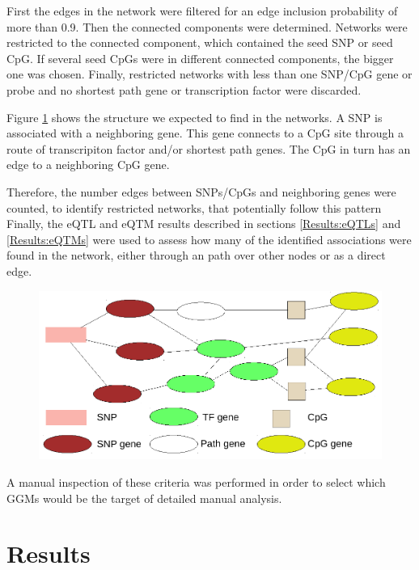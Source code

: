 \documentclass[a4paper,12pt,twoside,openright]{article}
\let\oldsection\section
\def\section{\cleardoublepage\oldsection}
\begin{document}
First the edges in the network were filtered for an edge inclusion probability of more than 0.9. Then the connected components were determined. Networks were restricted to the connected component, which contained the seed SNP or seed CpG. If several seed CpGs were in different connected components, the bigger one was chosen. Finally, restricted networks with less than one SNP/CpG gene or probe and no shortest path gene or transcription factor were discarded. 

Figure \ref{fig:ggm.expectation.scheme} shows the structure we expected to find in the networks. A SNP is associated with a neighboring gene. This gene connects to a CpG site through a route of transcripiton factor and/or shortest path genes. The CpG in turn has an edge to a neighboring CpG gene. 

Therefore, the number edges between SNPs/CpGs and neighboring genes were counted, to identify restricted networks, that potentially follow this pattern Finally, the eQTL and eQTM results described in sections \ref{Results:eQTLs} and \ref{Results:eQTMs} were used to assess how many of the identified associations were found in the network, either through an path over other nodes or as a direct edge. 

\begin{figure}[b!]
	\includegraphics[scale=0.92, keepaspectratio = true]{../figures/ggm_expectation_scheme}
	\caption{}
	\label{fig:ggm.expectation.scheme}
\end{figure}


A manual inspection of these criteria was performed in order to select which GGMs would be the target of detailed manual analysis. 

\newpage
\section{Results}
\label{Results}
\end{document}
